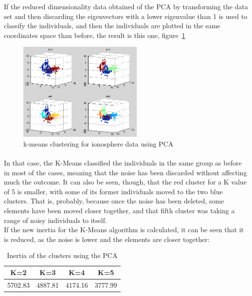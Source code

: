 \documentclass[12pt, a4paper]{article}
\begin{document}
If the reduced dimensionality data obtained of the PCA by transforming the data set and then discarding the eigenvectors with a lower eigenvalue than 1 is used to classify the individuals, and then the individuals are plotted in the same coordinates space than before, the result is this one, figure~\ref{fig:Ionosphere_2}
\begin{figure}[ht!]
	\centering
	\includegraphics[width=0.55\textwidth]{img/Ionosphere_2}
	\caption{k-means clustering for ionosphere data using PCA}
	\label{fig:Ionosphere_2}
\end{figure}
\paragraph{}In that case, the K-Means classified the individuals in the same group as before in most of the cases, meaning that the noise has been discarded without affecting much the outcome. It can also be seen, though, that the red cluster for a K value of 5 is smaller, with some of its former individuals moved to the two blue clusters. That is, probably, because once the noise has been deleted, some elements have been moved closer together, and that fifth cluster was taking a range of noisy individuals to itself.\\
\newpage
If the new inertia for the K-Means algorithm is calculated, it can be seen that it is reduced, as the noise is lower and the elements are closer together:
\begin{table}[ht!]
	\centering
	\begin{tabular}{|c|c|c|c|}
		\hline
		\rowcolor[gray]{0.85} \textbf{K=2}&\textbf{K=3}&\textbf{K=4}&\textbf{K=5}\\\hline
		5702.83&4887.81&4174.16&3777.99\\\hline
	\end{tabular}
	\caption{Inertia of the clusters using the PCA}
\end{table}
\end{document}
